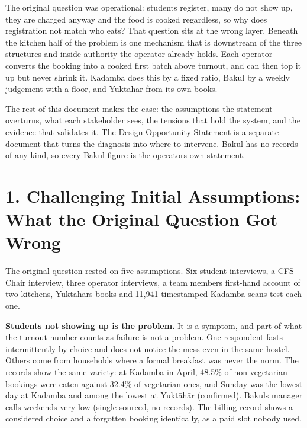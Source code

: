 \documentclass[
  10pt,
  table]{article}
\begin{document}
The original question was operational: students register, many do not show up, they are charged anyway and the food is cooked regardless, so why does registration not match who eats? That question sits at the wrong layer. Beneath the kitchen half of the problem is one mechanism that is downstream of the three structures and inside authority the operator already holds. Each operator converts the booking into a cooked first batch above turnout, and can then top it up but never shrink it. Kadamba does this by a fixed ratio, Bakul by a weekly judgement with a floor, and Yuktāhār from its own books.

The rest of this document makes the case: the assumptions the statement overturns, what each stakeholder sees, the tensions that hold the system, and the evidence that validates it. The Design Opportunity Statement is a separate document that turns the diagnosis into where to intervene. Bakul has no records of any kind, so every Bakul figure is the operator\textquotesingle s own statement.

\section{1. Challenging Initial Assumptions: What the Original Question Got Wrong}\label{challenging-initial-assumptions-what-the-original-question-got-wrong}

The original question rested on five assumptions. Six student interviews, a CFS Chair interview, three operator interviews, a team member\textquotesingle s first-hand account of two kitchens, Yuktāhār\textquotesingle s books and 11,941 timestamped Kadamba scans test each one.

\textbf{Students not showing up is the problem.} It is a symptom, and part of what the turnout number counts as failure is not a problem. One respondent fasts intermittently by choice and does not notice the mess even in the same hostel. Others come from households where a formal breakfast was never the norm. The records show the same variety: at Kadamba in April, 48.5\% of non-vegetarian bookings were eaten against 32.4\% of vegetarian ones, and Sunday was the lowest day at Kadamba and among the lowest at Yuktāhār (confirmed). Bakul\textquotesingle s manager calls weekends very low (single-sourced, no records). The billing record shows a considered choice and a forgotten booking identically, as a paid slot nobody used.
\end{document}
